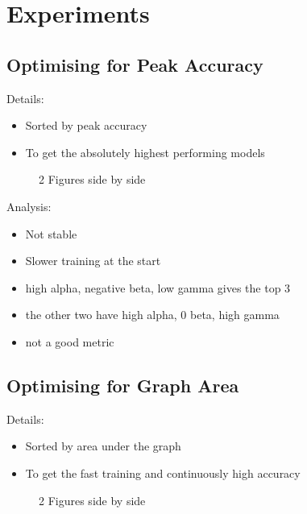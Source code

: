 \section{Experiments}
\subsection{Optimising for Peak Accuracy}
Details:
\begin{itemize}
	\item Sorted by peak accuracy
	\item To get the absolutely highest performing models
\end{itemize}


\begin{figure}
	\centering
	\qquad
	\caption{2 Figures side by side}%
	\label{fig:ex_peak}%
\end{figure}

Analysis:
\begin{itemize}
	\item Not stable
	\item Slower training at the start
	\item high alpha, negative beta, low gamma gives the top 3
	\item the other two have high alpha, 0 beta, high gamma
	\item not a good metric
\end{itemize}

\subsection{Optimising for Graph Area}
Details:
\begin{itemize}
	\item Sorted by area under the graph
	\item To get the fast training and continuously high accuracy
\end{itemize}

\begin{figure}
	\centering
	\qquad
	\caption{2 Figures side by side}%
	\label{fig:ex_aug}%
\end{figure}


